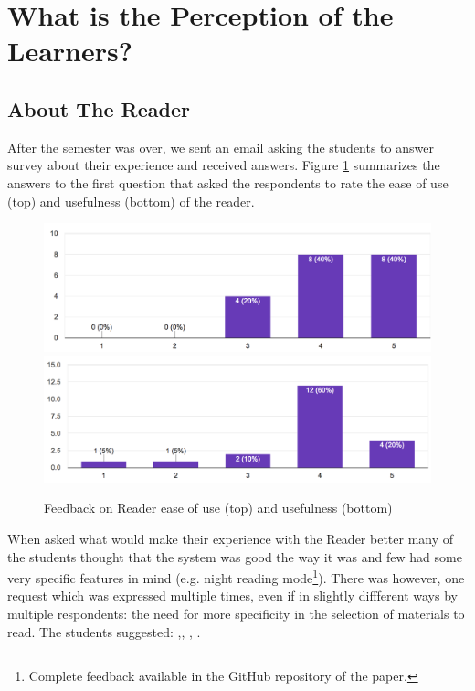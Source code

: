 
\newpage
\section{What is the Perception of the Learners?}
\label{sec:perception}

\subsection{About The Reader}

After the semester was over, we sent an email asking the students to answer survey about their experience and received \surveyrespondents answers. Figure \ref{fig:reader_use} summarizes the answers to the first question that asked the respondents to rate the ease of use (top) and usefulness (bottom) of the reader. 

 \begin{figure}[h!]
    \centering
      \includegraphics[width=0.8\columnwidth]{figures/opinions/reader_ease_of_use}
      \includegraphics[width=0.8\columnwidth]{figures/opinions/reader_usefulness}
      \caption{Feedback on Reader ease of use (top) and usefulness (bottom)}
      \label{fig:reader_use}
    \end{figure}

When asked what would make their experience with the Reader better many of the students thought that the system was good the way it was and few had some very specific features in mind (e.g. night reading mode\footnote{Complete feedback available in the GitHub repository of the paper.}). There was however, one request which was expressed multiple times, even if in slightly diffferent ways by multiple respondents: the need for more specificity in the selection of materials to read. The students suggested: ,, , . 

